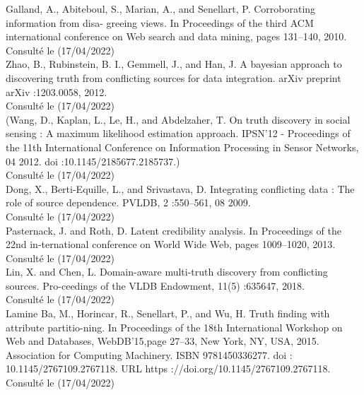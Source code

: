 \documentclass[12pt]{report}
\begin{document}
\begin{thebibliography}{99}
 Galland, A., Abiteboul, S., Marian, A., and Senellart, P. Corroborating information from disa- greeing views. In Proceedings of the third ACM international conference on Web search and data mining, pages 131–140, 2010.
			\\Consulté le (17/04/2022)\\

 Zhao, B., Rubinstein, B. I., Gemmell, J., and Han, J. A bayesian approach to discovering truth from conflicting sources for data integration. arXiv preprint arXiv :1203.0058, 2012.
			\\Consulté le (17/04/2022)\\

 (Wang, D., Kaplan, L., Le, H., and Abdelzaher, T. On truth discovery in social sensing : A maximum likelihood estimation approach. IPSN’12 - Proceedings of the 11th International Conference on Information Processing in Sensor Networks, 04 2012. doi :10.1145/2185677.2185737.)
			\\Consulté le (17/04/2022)\\

 Dong, X., Berti-Equille, L., and Srivastava, D. Integrating conflicting data : The role of source dependence. PVLDB, 2 :550–561, 08 2009.
			\\Consulté le (17/04/2022)\\

 Pasternack, J. and Roth, D. Latent credibility analysis. In Proceedings of the 22nd in-ternational conference on World Wide Web, pages 1009–1020, 2013.
			\\Consulté le (17/04/2022)\\

 Lin, X. and Chen, L. Domain-aware multi-truth discovery from conflicting sources. Pro-ceedings of the VLDB Endowment, 11(5) :635647, 2018.
			\\Consulté le (17/04/2022)\\

 Lamine Ba, M., Horincar, R., Senellart, P., and Wu, H. Truth finding with attribute partitio-ning. In Proceedings of the 18th International Workshop on Web and Databases, WebDB’15,page 27–33, New York, NY, USA, 2015. Association for Computing Machinery. ISBN 9781450336277. doi : 10.1145/2767109.2767118. URL https ://doi.org/10.1145/2767109.2767118.
			\\Consulté le (17/04/2022)\\



\end{thebibliography}
\end{document}
